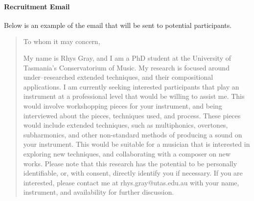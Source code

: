 \paragraph{Recruitment Email}

Below is an example of the email that will be sent to potential participants.

\begin{quotation}
    To whom it may concern,

My name is Rhys Gray, and I am a PhD student at the University of Tasmania’s Conservatorium of Music. 
My research is focused around under--researched extended techniques, and their compositional applications. 
I am currently seeking interested participants that play an instrument at a professional level that would be willing to assist me. 
This would involve workshopping pieces for your instrument, and being interviewed about the pieces, techniques used, and process. 
These pieces would include extended techniques, such as multiphonics, overtones, subharmonics, and other non-standard methods of producing a sound on your instrument. 
This would be suitable for a musician that is interested in exploring new techniques, and collaborating with a composer on new works. 
Please note that this research has the potential to be personally identifiable, or, with consent, directly identify you if necessary. 
If you are interested, please contact me at rhys.gray@utas.edu.au with your name, instrument, and availability for further discussion.

\end{quotation}